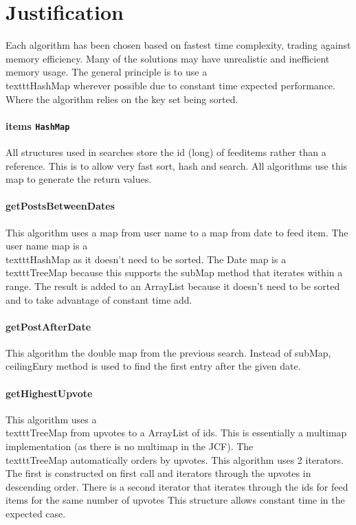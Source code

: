 \documentclass[11pt, oneside]{article}   	%
\begin{document}
\section{Justification}

Each algorithm has been chosen based on fastest time complexity, trading against memory efficiency. Many of the solutions may have unrealistic and inefficient memory usage. The general principle is to use a \\texttt{HashMap} wherever possible due to constant time expected performance. Where the algorithm relies on the key set being sorted. 

\paragraph{items \texttt{HashMap}}

All structures used in searches store the id (long) of feeditems rather than a reference. This is to allow very fast sort, hash and search. All algorithms use this map to generate the return values. 

\paragraph{getPostsBetweenDates}

This algorithm uses a map from user name to a map from date to feed item. The user name map is a \\texttt{HashMap} as it doesn't need to be sorted. The Date map is a \\texttt{TreeMap} because this supports the subMap method that iterates within a range. The result is added to an ArrayList because it doesn't need to be sorted and to take advantage of constant time add.

\paragraph{getPostAfterDate}

This algorithm the double map from the previous search. Instead of subMap, ceilingEnry method is used to find the first entry after the given date.

\paragraph{getHighestUpvote}

This algorithm uses a \\texttt{TreeMap} from upvotes to a ArrayList of ids. This is essentially a multimap implementation (as there is no multimap in the JCF). The \\texttt{TreeMap} automatically orders by upvotes. This algorithm uses 2 iterators. The first is constructed on first call and iterators through the upvotes in descending order. There is a second iterator that iterates through the ids for feed items for the same number of upvotes This structure allows constant time in the expected case.
\end{document}
